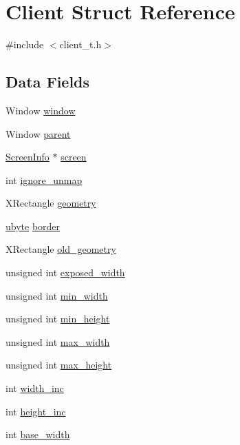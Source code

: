 \hypertarget{struct_client}{
\section{Client Struct Reference}
\label{struct_client}
}


{\ttfamily \#include $<$client\_\-t.h$>$}

\subsection*{Data Fields}
\begin{DoxyCompactItemize}
\item 
Window \hyperlink{struct_client_ac5b0b3c19d476a314bb68af9bc4a0ee0}{window}
\item 
Window \hyperlink{struct_client_a9222d5f7d6d375ac2c052eefe78af8a3}{parent}
\item 
\hyperlink{struct_screen_info}{ScreenInfo} $\ast$ \hyperlink{struct_client_a09e2e28eee0189347a7dc3406fdd5e6d}{screen}
\item 
int \hyperlink{struct_client_a96f59ed442b8ebb6f55b3ddae4348692}{ignore\_\-unmap}
\item 
XRectangle \hyperlink{struct_client_aac33c74a9e108df3ab284cf3a1cc8e21}{geometry}
\item 
\hyperlink{arwm_8h_a5dd4f281954ce1405c92d62a427f839a}{ubyte} \hyperlink{struct_client_ac02762c61f637035a296399efe9c753f}{border}
\item 
XRectangle \hyperlink{struct_client_aa9f24b399a2592237391d2cdedcb46b3}{old\_\-geometry}
\item 
unsigned int \hyperlink{struct_client_ac1076486ffbe5bc491c0de86c500b5f1}{exposed\_\-width}
\item 
unsigned int \hyperlink{struct_client_aa245bd84a82eece7d7eaef64599c17fd}{min\_\-width}
\item 
unsigned int \hyperlink{struct_client_a3d24f41c706cbbc405fbbf54db56c1d0}{min\_\-height}
\item 
unsigned int \hyperlink{struct_client_ac94bbe4c69d1d19af62fa63e54d5b760}{max\_\-width}
\item 
unsigned int \hyperlink{struct_client_aa359881e928cd3f4c3386bc004a0ba94}{max\_\-height}
\item 
int \hyperlink{struct_client_a55924e6ed4725b3ac7197489fffe8b70}{width\_\-inc}
\item 
int \hyperlink{struct_client_a190086fa558b76d771ec683385f0f813}{height\_\-inc}
\item 
int \hyperlink{struct_client_aa0b13e3f79d38a4b7237ab675747fa38}{base\_\-width}

\end{DoxyCompactItemize}
